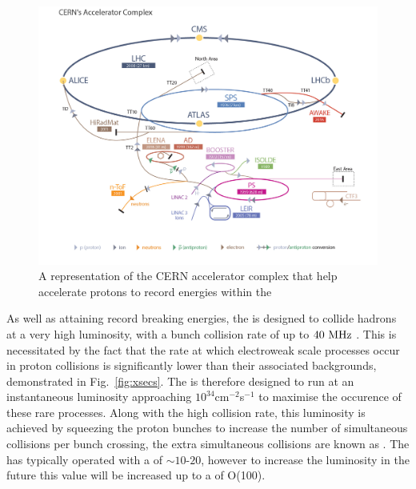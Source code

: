 \begin{figure}
  \includegraphics[width=\largefigwidth]{figs/LHC_default}
  \caption[]%
  {A representation of the CERN accelerator complex that help
  accelerate protons to record energies within the \LHC
  \cite{stfc:lhc}}%
  \label{fig:lhc}
\end{figure}

As well as attaining record breaking energies, the \LHC is designed to
collide hadrons at a very high luminosity, with a bunch collision rate
of up to $40~\text{MHz}$ \cite{Evans:2008zzb}. This is necessitated by the
fact that the rate at which electroweak scale processes
occur in proton collisions is significantly lower than their
associated backgrounds, demonstrated in Fig.~\ref{fig:xsecs}.
The \LHC is therefore designed to run at an instantaneous
luminosity approaching $10^{34}$cm$^{-2}$s$^{-1}$ to maximise the occurence of
these rare processes. Along with the high collision rate, this
luminosity is achieved by squeezing the proton bunches to increase the
number of simultaneous collisions per bunch crossing, the extra
simultaneous collisions are known as \PU.  The \LHC has typically
operated with a \PU of $\sim10\mbox{-}20$, however to increase the
luminosity in the future this value will be increased up to a \PU of
O(100).


